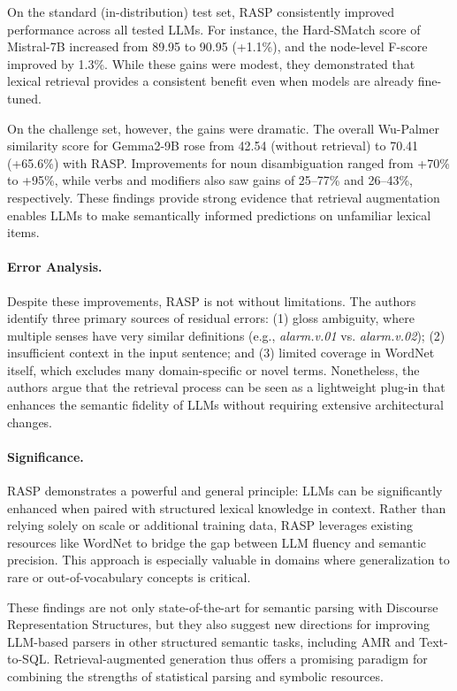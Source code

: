 On the standard (in-distribution) test set, RASP consistently improved performance across all tested LLMs. For instance, the Hard-SMatch score of Mistral-7B increased from 89.95 to 90.95 (+1.1\%), and the node-level F-score improved by 1.3\%. While these gains were modest, they demonstrated that lexical retrieval provides a consistent benefit even when models are already fine-tuned.

On the challenge set, however, the gains were dramatic. The overall Wu-Palmer similarity score for Gemma2-9B rose from 42.54 (without retrieval) to 70.41 (+65.6\%) with RASP. Improvements for noun disambiguation ranged from +70\% to +95\%, while verbs and modifiers also saw gains of 25--77\% and 26--43\%, respectively. These findings provide strong evidence that retrieval augmentation enables LLMs to make semantically informed predictions on unfamiliar lexical items.

\paragraph{Error Analysis.} Despite these improvements, RASP is not without limitations. The authors identify three primary sources of residual errors: (1) gloss ambiguity, where multiple senses have very similar definitions (e.g., \textit{alarm.v.01} vs. \textit{alarm.v.02}); (2) insufficient context in the input sentence; and (3) limited coverage in WordNet itself, which excludes many domain-specific or novel terms. Nonetheless, the authors argue that the retrieval process can be seen as a lightweight plug-in that enhances the semantic fidelity of LLMs without requiring extensive architectural changes.

\paragraph{Significance.} RASP demonstrates a powerful and general principle: LLMs can be significantly enhanced when paired with structured lexical knowledge in context. Rather than relying solely on scale or additional training data, RASP leverages existing resources like WordNet to bridge the gap between LLM fluency and semantic precision. This approach is especially valuable in domains where generalization to rare or out-of-vocabulary concepts is critical.

These findings are not only state-of-the-art for semantic parsing with Discourse Representation Structures, but they also suggest new directions for improving LLM-based parsers in other structured semantic tasks, including AMR and Text-to-SQL. Retrieval-augmented generation thus offers a promising paradigm for combining the strengths of statistical parsing and symbolic resources.

